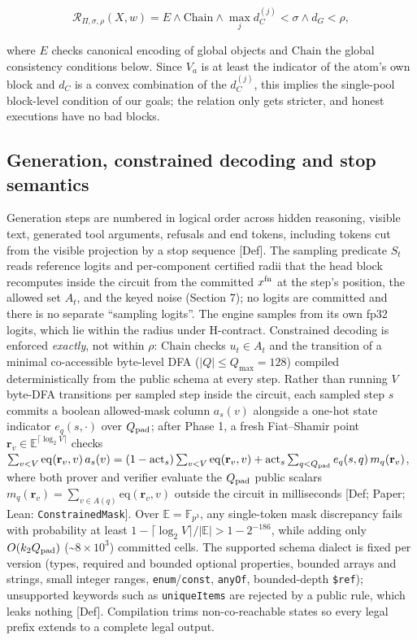 \documentclass[10pt]{article}
\begin{document}
\[\mathcal R_{\Pi,\sigma,\rho}(X,w)= E\wedge\mathrm{Chain}\wedge\max_j d^{(j)}_C<\sigma\wedge d_G<\rho,\]

where $E$ checks canonical encoding of global objects and $\mathrm{Chain}$ the global consistency conditions below. Since $V_a$ is at least the indicator of the atom's own block and $d_C$ is a convex combination of the $d^{(j)}_C$, this implies the single-pool block-level condition of our goals; the relation only gets stricter, and honest executions have no bad blocks.

\subsection{Generation, constrained decoding and stop semantics}
Generation steps are numbered in logical order across hidden reasoning, visible text, generated tool arguments, refusals and end tokens, including tokens cut from the visible projection by a stop sequence [Def]. The sampling predicate $S_t$ reads reference logits and per-component certified radii that the head block recomputes inside the circuit from the committed $x^{\rm fn}$ at the step's position, the allowed set $A_t$, and the keyed noise (Section 7); no logits are committed and there is no separate ``sampling logits''. The engine samples from its own fp32 logits, which lie within the radius under H-contract. Constrained decoding is enforced \emph{exactly}, not within $\rho$: $\mathrm{Chain}$ checks $u_t\in A_t$ and the transition of a minimal co-accessible byte-level DFA ($|Q|\le Q_{\max}=128$) compiled deterministically from the public schema at every step. Rather than running $V$ byte-DFA transitions per sampled step inside the circuit, each sampled step $s$ commits a boolean allowed-mask column $a_s(v)$ alongside a one-hot state indicator $e_q(s,\cdot)$ over $Q_{\rm pad}$; after Phase 1, a fresh Fiat--Shamir point $\mathbf r_v\in\mathbb E^{\lceil\log_2 V\rceil}$ checks $\sum_{v<V}\mathrm{eq}(\mathbf r_v,v)\,a_s(v)=(1-\mathrm{act}_s)\sum_{v<V}\mathrm{eq}(\mathbf r_v,v)+\mathrm{act}_s\sum_{q<Q_{\rm pad}}e_q(s,q)\,m_q(\mathbf r_v)$, where both prover and verifier evaluate the $Q_{\rm pad}$ public scalars $m_q(\mathbf r_v)=\sum_{v\in A(q)}\mathrm{eq}(\mathbf r_v,v)$ outside the circuit in milliseconds [Def; Paper; Lean: \texttt{ConstrainedMask}]. Over $\mathbb E=\mathbb F_{p^3}$, any single-token mask discrepancy fails with probability at least $1-\lceil\log_2 V\rceil/\lvert\mathbb E\rvert>1-2^{-186}$, while adding only $O(k_2 Q_{\rm pad})$ (\textasciitilde{}$8\times 10^3$) committed cells. The supported schema dialect is fixed per version (types, required and bounded optional properties, bounded arrays and strings, small integer ranges, \texttt{enum}/\texttt{const}, \texttt{anyOf}, bounded-depth \texttt{\$ref}); unsupported keywords such as \texttt{uniqueItems} are rejected by a public rule, which leaks nothing [Def]. Compilation trims non-co-reachable states so every legal prefix extends to a complete legal output.
\end{document}
